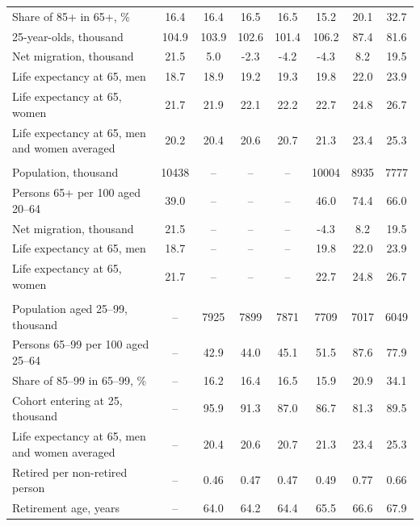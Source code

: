 \begin{tabular}{@{}lS[table-format=5.2]S[table-format=5.2]S[table-format=5.2]S[table-format=5.2]S[table-format=5.2]S[table-format=5.2]S[table-format=5.2]@{}}
Share of 85+ in 65+, \% & 16.4 & 16.4 & 16.5 & 16.5 & 15.2 & 20.1 & 32.7 \\
25-year-olds, thousand & 104.9 & 103.9 & 102.6 & 101.4 & 106.2 & 87.4 & 81.6 \\
Net migration, thousand & 21.5 & 5.0 & -2.3 & -4.2 & -4.3 & 8.2 & 19.5 \\
Life expectancy at 65, men & 18.7 & 18.9 & 19.2 & 19.3 & 19.8 & 22.0 & 23.9 \\
Life expectancy at 65, women & 21.7 & 21.9 & 22.1 & 22.2 & 22.7 & 24.8 & 26.7 \\
Life expectancy at 65, men and women averaged & 20.2 & 20.4 & 20.6 & 20.7 & 21.3 & 23.4 & 25.3 \\
\addlinespace{}\\
Population, thousand & 10438 & {--} & {--} & {--} & 10004 & 8935 & 7777 \\
Persons 65+ per 100 aged 20--64 & 39.0 & {--} & {--} & {--} & 46.0 & 74.4 & 66.0 \\
Net migration, thousand & 21.5 & {--} & {--} & {--} & -4.3 & 8.2 & 19.5 \\
Life expectancy at 65, men & 18.7 & {--} & {--} & {--} & 19.8 & 22.0 & 23.9 \\
Life expectancy at 65, women & 21.7 & {--} & {--} & {--} & 22.7 & 24.8 & 26.7 \\
\addlinespace{}\\
Population aged 25--99, thousand & {--} & 7925 & 7899 & 7871 & 7709 & 7017 & 6049 \\
Persons 65--99 per 100 aged 25--64 & {--} & 42.9 & 44.0 & 45.1 & 51.5 & 87.6 & 77.9 \\
Share of 85--99 in 65--99, \% & {--} & 16.2 & 16.4 & 16.5 & 15.9 & 20.9 & 34.1 \\
Cohort entering at 25, thousand & {--} & 95.9 & 91.3 & 87.0 & 86.7 & 81.3 & 89.5 \\
Life expectancy at 65, men and women averaged & {--} & 20.4 & 20.6 & 20.7 & 21.3 & 23.4 & 25.3 \\
Retired per non-retired person & {--} & 0.46 & 0.47 & 0.47 & 0.49 & 0.77 & 0.66 \\
Retirement age, years & {--} & 64.0 & 64.2 & 64.4 & 65.5 & 66.6 & 67.9 \\
\bottomrule
\end{tabular}
